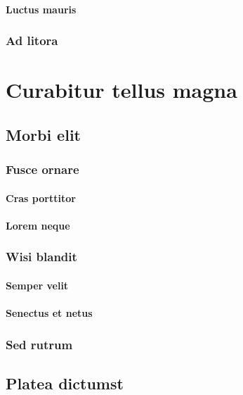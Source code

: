 \subsubsection{Luctus mauris} \lipsum[20]
\subsection{Ad litora} \lipsum [21-22]



\chapter{Curabitur tellus magna}


 \lipsum[1-2]

\section{Morbi elit} \lipsum[3-4]
\subsection{Fusce ornare} \lipsum[5]
\subsubsection{Cras porttitor} \lipsum[6]
\subsubsection{Lorem neque} \lipsum[7]
\subsection{Wisi blandit} \lipsum[8]
\subsubsection{Semper velit} \lipsum[9]
\subsubsection{Senectus et netus} \lipsum[10]
\subsection{Sed rutrum} \lipsum[11-12]

\section{Platea dictumst} \lipsum[13-14]
